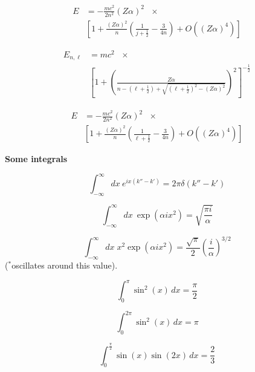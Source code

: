 \documentclass[11pt]{article}
\begin{document}
\begin{multicols}{2}
\begin{align}
  E & = - \frac{mc^2}{2n^2} (Z\alpha)^2 \:\:\: \times \nonumber \\
  & \left[ 1 + \frac{(Z\alpha)^2}{n}
  \left( \frac{1}{j+\frac{1}{2}} - \frac{3}{4n}
  \right)
  +O((Z\alpha)^4) \right]
\end{align}


\begin{align}
  E_{n,\ell} & = mc^2 \:\:\: \times \nonumber \\
    & \left[1 +
    \left(
    \frac{Z\alpha}{
      n - (\ell+\frac{1}{2}) + \sqrt{(\ell+\frac{1}{2})^2 - (Z\alpha)^2}
      }
    \right)^2
    \right]^{-\frac{1}{2}}
\end{align}

\begin{align}
  E & = - \frac{mc^2}{2n^2} (Z\alpha)^2 \:\:\: \times \nonumber \\
  & \left[ 1 + \frac{(Z\alpha)^2}{n}
  \left( \frac{1}{\ell+\frac{1}{2}} - \frac{3}{4n}
  \right)
  +O((Z\alpha)^4) \right]
\end{align}

{\bf Some integrals}

\begin{equation}
\int_{-\infty}^{\infty} dx \: e^{ix(k''-k')} = 2 \pi \delta (k''-k')
\end{equation}

\begin{equation}
\int_{-\infty}^{\infty} dx \: \exp (\alpha i x^2) = \sqrt{\frac{\pi i}{\alpha}}
\label{eq:simp_int}
\end{equation}

\begin{equation}
\int_{-\infty}^{\infty} dx \; x^2 \exp (\alpha i x^2)
  = \frac{\sqrt{\pi}}{2} \left( \frac{i}{\alpha} \right)^{3/2}
\label{eq:2nd_simp_int}
\end{equation}
{\small ($^{*}$oscillates around this value)}.

\begin{equation}
\int_{0}^{\pi} \sin^{2}{\left (x \right )}\, dx  =  \frac{\pi}{2}
\end{equation}

\begin{equation}
\int_{0}^{2 \pi} \sin^{2}{\left (x \right )}\, dx  =  \pi
\end{equation}

\begin{equation}
\int_{0}^{\frac{\pi}{2}} \sin{\left (x \right )} \sin{\left (2 x \right )}\, dx  =  \frac{2}{3}
\end{equation}




\end{multicols}
\end{document}
